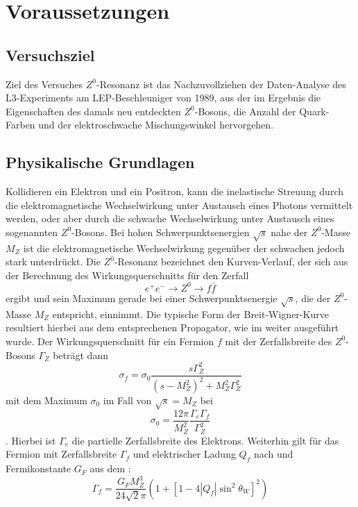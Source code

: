 \section{Voraussetzungen}

\subsection{Versuchsziel}

Ziel des Versuches $Z^0$-Resonanz ist das Nachzuvollziehen der Daten-Analyse des
L3-Experiments am LEP-Beschleuniger von 1989, aus der im Ergebnis die
Eigenschaften des damals neu entdeckten $Z^0$-Bosons, die Anzahl der
Quark-Farben und der elektroschwache Mischungswinkel hervorgehen.

\subsection{Physikalische Grundlagen}

Kollidieren ein Elektron und ein Positron, kann die inelastische Streuung durch
die elektromagnetische Wechselwirkung unter Austausch eines Photons vermittelt
werden, oder aber durch die schwache Wechselwirkung unter Austausch eines
sogenannten $Z^0$-Bosons. Bei hohen Schwerpunktsenergien $\sqrt{s}$ nahe der
$Z^0$-Masse $M_Z$ ist die elektromagnetische Wechselwirkung gegenüber der
schwachen jedoch stark unterdrückt.
Die $Z^0$-Resonanz bezeichnet den Kurven-Verlauf, der sich aus der
Berechnung des Wirkungsquerschnitts für den Zerfall
\begin{equation}
  e^{+} e^{-} \rightarrow Z^0 \rightarrow f \bar{f}
\end{equation}
ergibt und sein Maximum gerade bei einer Schwerpunktsenergie
$\sqrt{s}$, die der $Z^0$-Masse $M_Z$ entspricht, einnimmt. Die typische Form
der Breit-Wigner-Kurve resultiert hierbei aus dem entsprechenen Propagator,
wie im \cite[Gl. 2]{script} weiter ausgeführt wurde. Der Wirkungsquerschnitt für
ein Fermion $f$ mit der Zerfallsbreite des $Z^0$-Bosons $\Gamma_Z$ beträgt dann
\begin{equation}
  \label{eqn:sigmaf}
  \sigma_f = \sigma_0 \frac{s \Gamma_Z^2}{(s - M_Z^2)^2 + M_Z^2\Gamma_Z^2}
\end{equation}
mit dem Maximum $\sigma_0$ im Fall von $\sqrt{s} = M_Z$ bei
\begin{equation}
  \sigma_0 = \frac{12\pi}{M_Z^2}\frac{\Gamma_e\Gamma_f}{\Gamma_Z^2}
\end{equation}
. Hierbei ist $\Gamma_e$ die partielle Zerfallsbreite des Elektrons. Weiterhin gilt
für das Fermion mit Zerfallsbreite $\Gamma_f$ und elektrischer Ladung $Q_f$ nach
\cite[Gl. 6]{script} und Fermikonstante $G_F$ aus dem \cite{pdb}:
\begin{equation}
  \Gamma_f = \frac{G_F M_Z^3}{24 \sqrt{2}\pi}\left(1+[1-4|Q_f|\sin^2θ_W]^2\right)
\end{equation}


